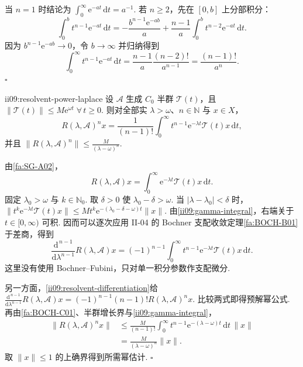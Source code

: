 \begin{FAProof}
当 \(\displaystyle n=1\) 时结论为 \(\displaystyle\int_0^\infty\mathrm{e}^{-at}\,\mathrm{d}t=a^{-1}\). 若 \(\displaystyle n\geqslant2\)，先在 \(\displaystyle[0,b]\) 上分部积分：
\[
\int_0^b t^{n-1}\mathrm{e}^{-at}\,\mathrm{d}t
=
-\frac{b^{n-1}\mathrm{e}^{-ab}}{a}
+
\frac{n-1}{a}
\int_0^b t^{n-2}\mathrm{e}^{-at}\,\mathrm{d}t.
\]
因为 \(\displaystyle b^{n-1}\mathrm{e}^{-ab}\to0\)，令 \(\displaystyle b\to\infty\) 并归纳得到
\[
\int_0^\infty t^{n-1}\mathrm{e}^{-at}\,\mathrm{d}t
=
\frac{n-1}{a}\frac{(n-2)!}{a^{n-1}}
=
\frac{(n-1)!}{a^n}.\]
\hfill\(\square\)


\end{FAProof}

\begin{FAProposition}{ii09:resolvent-power-laplace}
设 \(\displaystyle\mathcal A\) 生成 \(\displaystyle C_0\) 半群 \(\displaystyle\mathcal T(t)\)，且 \(\displaystyle \|\mathcal T(t)\| \leqslant M\mathrm{e}^{\omega t} \; \forall\,t\geqslant0.\)
则对全部实 \(\displaystyle\lambda>\omega\)、\(\displaystyle n\in\mathbb N\) 与 \(\displaystyle x\in X\)，
\[
R(\lambda,\mathcal A)^n x
=
\frac1{(n-1)!}
\int_0^\infty
t^{n-1}\mathrm{e}^{-\lambda t}\mathcal T(t)x
\,\mathrm{d}t,
\]
并且 \(\displaystyle \|R(\lambda,\mathcal A)^n\| \leqslant \frac{M}{(\lambda-\omega)^n}.\)
\end{FAProposition}

\begin{FAProof}
由\autoref{fa:SG-A02}，
\[
R(\lambda,\mathcal A)x
=
\int_0^\infty
\mathrm{e}^{-\lambda t}\mathcal T(t)x
\,\mathrm{d}t.
\]
固定 \(\displaystyle\lambda_0>\omega\) 与 \(\displaystyle k\in\mathbb N_0\). 取 \(\displaystyle\delta>0\) 使 \(\displaystyle\lambda_0-\delta>\omega\). 当 \(\displaystyle|\lambda-\lambda_0|<\delta\) 时， \(\displaystyle \|t^k\mathrm{e}^{-\lambda t}\mathcal T(t)x\| \leqslant M t^k\mathrm{e}^{-(\lambda_0-\delta-\omega)t}\|x\|.\)
由\autoref{ii09:gamma-integral}，右端关于 \(\displaystyle t\in[0,\infty)\) 可积. 因而可以逐次应用 II-04 的 Bochner 支配收敛定理\autoref{fa:BOCH-B01}于差商，得到
\[
\frac{\mathrm{d}^{\,n-1}}{\mathrm{d}\lambda^{n-1}}
R(\lambda,\mathcal A)x
=
(-1)^{n-1}
\int_0^\infty
t^{n-1}\mathrm{e}^{-\lambda t}\mathcal T(t)x
\,\mathrm{d}t.
\]
这里没有使用 Bochner--Fubini，只对单一积分参数作支配微分.

另一方面，\autoref{ii09:resolvent-differentiation}给 \(\displaystyle \frac{\mathrm{d}^{\,n-1}}{\mathrm{d}\lambda^{n-1}} R(\lambda,\mathcal A)x = (-1)^{n-1}(n-1)!R(\lambda,\mathcal A)^n x.\)
比较两式即得预解幂公式. 再由\autoref{fa:BOCH-C01}、半群增长界与\autoref{ii09:gamma-integral}，
\[
\begin{aligned}
\displaystyle \|R(\lambda,\mathcal A)^n x\|
&\displaystyle \leqslant
\frac{M}{(n-1)!}
\int_0^\infty
t^{n-1}\mathrm{e}^{-(\lambda-\omega)t}\,\mathrm{d}t\,\|x\|\\[12pt]
&\displaystyle =
\frac{M}{(\lambda-\omega)^n}\|x\|.
\end{aligned}
\]
取 \(\displaystyle\|x\|\leqslant1\) 的上确界得到所需幂估计.
\hfill\(\square\)
\end{FAProof}

